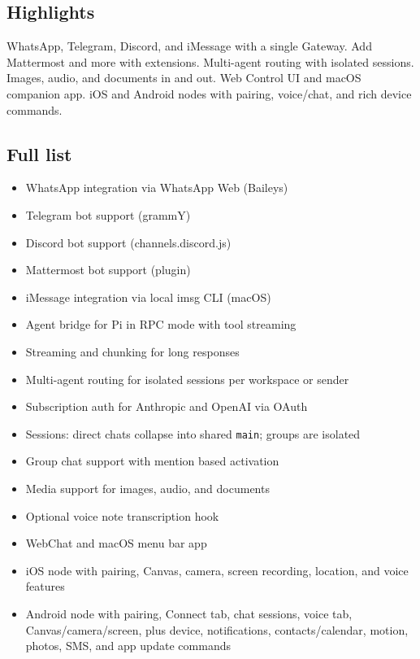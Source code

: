 \subsection{Highlights}


WhatsApp, Telegram, Discord, and iMessage with a single Gateway.
Add Mattermost and more with extensions.
Multi-agent routing with isolated sessions.
Images, audio, and documents in and out.
Web Control UI and macOS companion app.
iOS and Android nodes with pairing, voice/chat, and rich device commands.

\subsection{Full list}


\begin{itemize}
  \item WhatsApp integration via WhatsApp Web (Baileys)
  \item Telegram bot support (grammY)
  \item Discord bot support (channels.discord.js)
  \item Mattermost bot support (plugin)
  \item iMessage integration via local imsg CLI (macOS)
  \item Agent bridge for Pi in RPC mode with tool streaming
  \item Streaming and chunking for long responses
  \item Multi-agent routing for isolated sessions per workspace or sender
  \item Subscription auth for Anthropic and OpenAI via OAuth
  \item Sessions: direct chats collapse into shared \texttt{main}; groups are isolated
  \item Group chat support with mention based activation
  \item Media support for images, audio, and documents
  \item Optional voice note transcription hook
  \item WebChat and macOS menu bar app
  \item iOS node with pairing, Canvas, camera, screen recording, location, and voice features
  \item Android node with pairing, Connect tab, chat sessions, voice tab, Canvas/camera/screen, plus device, notifications, contacts/calendar, motion, photos, SMS, and app update commands
\end{itemize}


